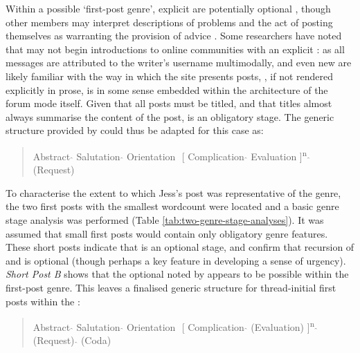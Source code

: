 %
Within a possible `first\hyp{}\gls{post} genre', explicit  are potentially optional \cite{vayreda_social_2009}, though other members may interpret descriptions of problems and the act of posting themselves as warranting the provision of advice \cite{goldsmith2000soliciting}. Some researchers \cite[e.g. ][]{herring_two_1996,weber_missed_2011} have noted that  may not begin introductions to online communities with an explicit : as all messages are attributed to the writer's username multimodally, and even new  are likely familiar with the way in which the site presents \glspl{post}, , if not rendered explicitly in prose, is in some sense embedded within the architecture of the \gls{forum} \gls{mode} itself. Given that all \glspl{post} must be titled, and that titles almost always summarise the content of the \gls{post},  is an obligatory stage. The generic structure provided by \textcite{labov_narrative_1997} could thus be adapted for this case as:

\begin{quotation}\small
\noindent Abstract $\hat{}$ Salutation $\hat{}$ Orientation $\hat{}$ [ Complication $\hat{}$ Evaluation ]\textsuperscript{n} $\hat{}$ (Request)
\end{quotation}
%
To characterise the extent to which Jess's post was representative of the genre, the two first \glspl{post} with the smallest wordcount were located and a basic genre stage analysis was performed (Table \ref{tab:two-genre-stage-analyses}). It was assumed that small first \glspl{post} would contain only obligatory genre features. These short \glspl{post} indicate that  is an optional stage, and confirm that recursion of  and  is optional (though perhaps a key feature in developing a sense of urgency). \emph{Short Post B} shows that the optional  noted by \textcite{labov_narrative_1997} appears to be possible within the first\hyp{}\gls{post} genre. This leaves a finalised generic structure for \gls{thread}\hyp{}initial first \glspl{post} within the :

\begin{quotation}\small
\noindent Abstract $\hat{}$ Salutation $\hat{}$ Orientation $\hat{}$ [ Complication $\hat{}$ (Evaluation) ]\textsuperscript{n} $\hat{}$ (Request) $\hat{}$ (Coda)
\end{quotation}

